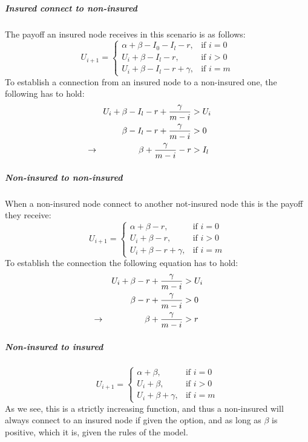 \subparagraph{Insured connect to non-insured}
The payoff an insured node receives in this scenario is as follows:
\begin{equation}
    U_{i+1}= 
\begin{cases}
    \alpha + \beta - I_{0} - I_{l} -r,& \text{if } i = 0\\
    U_{i}+\beta -I_{l}-r,& \text{if }  i>0\\
    U_{i}+\beta -I_{l}-r+\gamma,& \text{if } i=m
\end{cases}
\label{eq:itonoti}
\end{equation}
To establish a connection from an insured node to a non-insured one, the following has to hold:
\begin{eqnarray}
U_{i}+\beta-I_{l}-r+\frac{\gamma}{m-i}&>U_{i} \nonumber \\ 
\beta-I_{l}-r+\frac{\gamma}{m-i}&>0 \nonumber \\ 
\llap{$\rightarrow$\hspace{50pt}} \beta+\frac{\gamma}{m-i}-r&>I_{l} 
\end{eqnarray}
\subparagraph{Non-insured to non-insured}
When a non-insured node connect to another not-insured node this is the payoff they receive:
\begin{equation}
    U_{i+1}= 
\begin{cases}
    \alpha + \beta -r,& \text{if } i = 0\\
    U_{i}+\beta -r,& \text{if }  i>0\\
    U_{i}+\beta -r +\gamma,& \text{if } i=m
\end{cases}
\label{eq:noitonoti}
\end{equation}
To establish the connection the following equation has to hold:
\begin{eqnarray}
U_{i}+\beta-r+\frac{\gamma}{m-i}&>U_{i} \nonumber \\ 
\beta-r+\frac{\gamma}{m-i}&>0 \nonumber \\ 
\llap{$\rightarrow$\hspace{50pt}} \beta+\frac{\gamma}{m-i}&>r
\end{eqnarray}
\subparagraph{Non-insured to insured}
\begin{equation}
    U_{i+1}= 
\begin{cases}
    \alpha + \beta,& \text{if } i = 0\\
    U_{i}+\beta,& \text{if }  i>0\\
    U_{i}+\beta +\gamma,& \text{if } i=m
\end{cases}
\label{eq:noitoti}
\end{equation}
As we see, this is a strictly increasing function, and thus a non-insured will always connect to an insured node if given the option, and as long as $\beta$ is positive, which it is, given the rules of the model.

